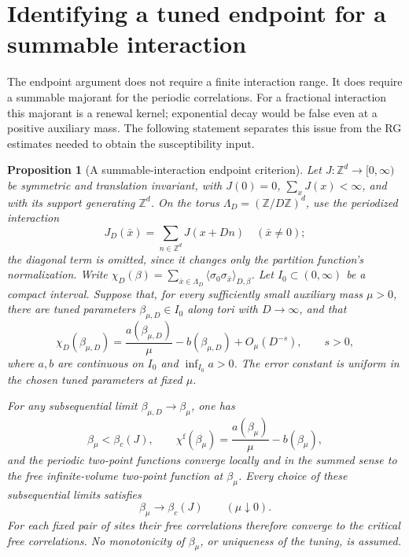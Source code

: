 \documentclass[11pt]{article}
\newtheorem{proposition}{Proposition}[section]
\begin{document}
\section{Identifying a tuned endpoint for a summable interaction}
\label{frac:sec-endpoint}

The endpoint argument does not require a finite interaction range.
It does require a summable majorant for the periodic correlations.
For a fractional interaction this majorant is a renewal kernel;
exponential decay would be false even at a positive auxiliary mass.
The following statement separates this issue from the RG estimates
needed to obtain the susceptibility input.

\begin{proposition}[A summable-interaction endpoint criterion]
\label{frac:endpoint}
Let \(J:\mathbb Z^d\to[0,\infty)\) be symmetric and translation
invariant, with \(J(0)=0\), \(\sum_xJ(x)<\infty\), and with its
support generating \(\mathbb Z^d\). On the torus
\(\Lambda_D=(\mathbb Z/D\mathbb Z)^d\), use the periodized
interaction
\[
 J_D(\bar x)=\sum_{n\in\mathbb Z^d}J(x+Dn)
 \quad(\bar x\ne0);
\]
the diagonal term is omitted, since it changes only the partition
function's normalization. Write
\(\chi_D(\beta)=\sum_{\bar x\in\Lambda_D}
\langle\sigma_0\sigma_{\bar x}\rangle_{D,\beta}\).
Let \(I_0\subset(0,\infty)\) be a compact interval. Suppose that,
for every sufficiently small auxiliary mass \(\mu>0\), there are
tuned parameters \(\beta_{\mu,D}\in I_0\) along tori with
\(D\to\infty\), and that
\begin{equation}\label{frac:eq-susceptibility-input}
 \chi_D(\beta_{\mu,D})
 =\frac{a(\beta_{\mu,D})}{\mu}-b(\beta_{\mu,D})
       +O_\mu(D^{-s}),\qquad s>0,
\end{equation}
where \(a,b\) are continuous on \(I_0\) and
\(\inf_{I_0}a>0\). The error constant is uniform in the chosen
tuned parameters at fixed \(\mu\).

For any subsequential limit
\(\beta_{\mu,D}\to\beta_\mu\), one has
\[
 \beta_\mu<\beta_c(J),\qquad
 \chi^{\mathrm f}(\beta_\mu)
       =\frac{a(\beta_\mu)}{\mu}-b(\beta_\mu),
\]
and the periodic two-point functions converge locally and in the
summed sense to the free infinite-volume two-point function at
\(\beta_\mu\). Every choice of these subsequential limits satisfies
\[
 \beta_\mu\longrightarrow\beta_c(J)
       \qquad(\mu\downarrow0).
\]
For each fixed pair of sites their free correlations therefore
converge to the critical free correlations. No monotonicity of
\(\beta_\mu\), or uniqueness of the tuning, is assumed.
\end{proposition}
\end{document}
